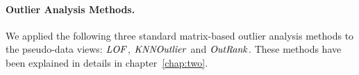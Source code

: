 	\paragraph{Outlier Analysis Methods.}
	
	
	We applied the following three standard matrix-based outlier analysis methods to the pseudo-\iid data views: $\it{LOF}$, $\it{KNNOutlier}$ and $\it{OutRank}$. These methods have been explained in details in chapter~\ref{chap:two}.
	
	
%									
									
%									
								
